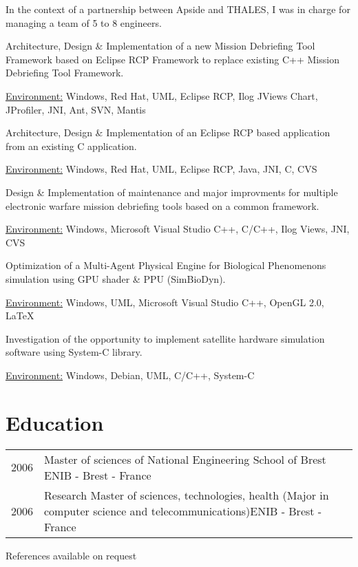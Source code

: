 \documentclass[10pt,letterpaper]{resume/resume}
\begin{document}
\begin{minipage}[t]{\linewidth}
\par In the context of a partnership between Apside and THALES, I was in charge for managing a team of 5 to 8 engineers.
\par Architecture, Design \& Implementation of a new Mission Debriefing Tool Framework based on Eclipse RCP Framework to replace existing C++ Mission Debriefing Tool Framework.
\par\underline{Environment:} Windows, Red Hat, UML, Eclipse RCP, Ilog JViews Chart, JProfiler, JNI, Ant, SVN, Mantis

\par Architecture, Design \& Implementation of an Eclipse RCP based application from an existing C application.
\par\underline{Environment:} Windows, Red Hat, UML, Eclipse RCP, Java, JNI, C, CVS

\par Design \& Implementation of maintenance and major improvments for multiple electronic warfare mission debriefing tools based on a common framework.
\par\underline{Environment:} Windows, Microsoft Visual Studio C++, C/C++, Ilog Views, JNI, CVS

\par Optimization of a Multi-Agent Physical Engine for Biological Phenomenons simulation using GPU shader \& PPU (SimBioDyn).
\par\underline{Environment:} Windows, UML, Microsoft Visual Studio C++, OpenGL 2.0, \LaTeX

\par Investigation of the opportunity to implement satellite hardware simulation software using System-C library.
\par\underline{Environment:} Windows, Debian, UML, C/C++, System-C
  \end{minipage}

  \begin{minipage}[t]{\linewidth}
    \section{Education}
      \begin{tabularx}{\linewidth}{lX}%
        2006 & Master of sciences of National Engineering School of Brest \hfill ENIB - Brest - France\\ 
        2006 & Research Master of sciences, technologies, health (Major in computer science and telecommunications)\hfill ENIB - Brest - France\\
      \end{tabularx}%
  \end{minipage}

  \vfill
  \begin{center}References available on request\end{center}
\end{document}
